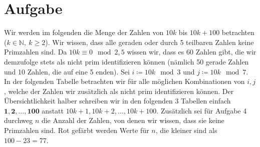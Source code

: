 \documentclass{article}
\begin{document}
    \section{Aufgabe}
    Wir werden im folgenden die Menge der Zahlen von $10k$ bis $10k+100$ betrachten ($k\in \mathbb{N},\ k\geq 2$). Wir wissen, dass alle geraden oder durch 5 teilbaren Zahlen keine Primzahlen sind. Da $10 k \equiv 0 \mod 2, 5$ wissen wir, dass es 60 Zahlen gibt, die wir demzufolge stets als nicht prim identifizieren können (nämlich 50 gerade Zahlen und 10 Zahlen, die auf eine 5 enden).
    Sei $i \coloneqq 10k \mod 3$ und $j \coloneqq 10k \mod 7$.
    In der folgenden Tabelle betrachten wir für alle möglichen Kombinationen von $i, j$, welche der Zahlen wir zusätzlich als nicht prim identifizieren können. Der Übersichtlichkeit halber schreiben wir in den folgenden 3 Tabellen einfach $\mathbf{1}, \mathbf{2}, \mathbf{\dots}, \mathbf{100}$ anstatt $10k+1, 10k+2, \dots, 10k+100$. Zusätzlich sei für Aufgabe 4 durchweg $n$ die Anzahl der Zahlen, von denen wir wissen, dass sie keine Primzahlen sind. Rot gefärbt werden Werte für $n$, die kleiner sind als $100-23 = 77$.\\\ \\
\end{document}

